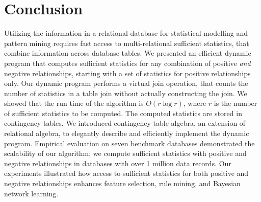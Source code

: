\documentclass{acm_proc_article-sp}
\newcommand{\ct}{\mathit{ct}}
\begin{document}
\section{Conclusion} \label{sec:conclusion} 
Utilizing the information in a relational database for statistical modelling and pattern mining requires fast access to multi-relational sufficient statistics, that combine information across database tables. 
We presented an efficient dynamic program that computes sufficient statistics for any combination of positive {\em and} negative relationships, starting with a set of statistics for positive relationships only.
Our dynamic program performs a virtual join operation, that counts the number of statistics in a table join without actually constructing the join. We showed that the run time of the algorithm is $O(r \log r)$, where $r$ is the number of sufficient statistics to be computed.
The computed statistics are stored in contingency tables.
We introduced contingency table algebra, an extension of relational algebra, to elegantly describe and efficiently implement the dynamic program. 
Empirical evaluation on seven benchmark databases demonstrated the scalability of our algorithm; we compute sufficient statistics with positive and negative relationships in databases with over 1 million data records.  
Our experiments illustrated how access to sufficient statistics for both positive and negative relationships enhances feature selection, rule mining, and Bayesian network learning.  

%
%
\end{document}
